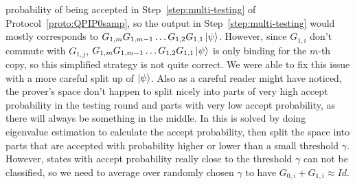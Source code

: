  probability of being accepted in Step~\ref{step:multi-testing} of Protocol~\ref{proto:QPIP0samp}, so the output in  Step~\ref{step:multi-testing} would mostly corresponds to $G_{1,m} G_{1,m-1}\dots G_{1,2}G_{1,1}\ket{\psi}$. However, since $G_{1,i}$ don't commute with $G_{1,j}$, $G_{1,m} G_{1,m-1}\dots G_{1,2}G_{1,1}\ket{\psi}$ is only binding for the $m$-th copy, so this simplified strategy is not quite correct. We were able to fix this issue with a more careful split up of $\ket{\psi}$. Also as a careful reader might have noticed, the prover's space don't happen to split nicely into parts of very high accept probability in the testing round and parts with very low accept probability, as there will always be something in the middle. In \cite{arXiv:ChiaChungYam19} this is solved by doing eigenvalue estimation to calculate the accept probability, then split the space into parts that are accepted with probability higher or lower than a small threshold $\gamma$. However, states with accept probability really close to the threshold $\gamma$ can not be classified, so we need to average over randomly chosen $\gamma$ to have $G_{0,i}+G_{1,i} \approx Id$.
 
 


